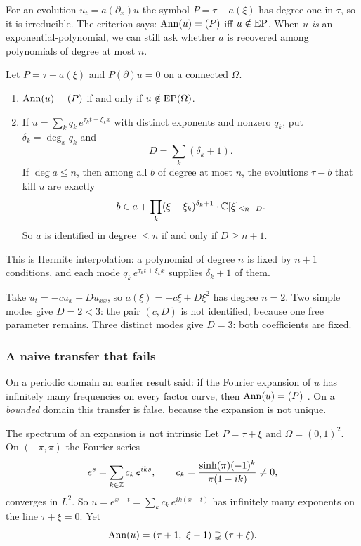 For an evolution $u_t=a(\partial_x)u$ the symbol $P=\tau-a(\xi)$ has degree one in $\tau$, so it is irreducible. The criterion says: $\operatorname{Ann}(u)=(P)$ iff $u\notin\mathrm{EP}$. When $u$ \emph{is} an exponential-polynomial, we can still ask whether $a$ is recovered among polynomials of degree at most $n$.

\begin{theorem}\label{thm:evol}
Let $P=\tau-a(\xi)$ and $P(\partial)u=0$ on a connected $\Omega$.
\begin{enumerate}[label=(\alph*)]
\item $\operatorname{Ann}(u)=(P)$ if and only if $u\notin\mathrm{EP}(\Omega)$.
\item If $u=\sum_kq_k\,e^{\tau_kt+\xi_kx}$ with distinct exponents and nonzero $q_k$, put $\delta_k=\deg_xq_k$ and
\[
D=\sum_k(\delta_k+1).
\]
If $\deg a\le n$, then among all $b$ of degree at most $n$, the evolutions $\tau-b$ that kill $u$ are exactly
\[
b\in a+\prod_k(\xi-\xi_k)^{\delta_k+1}\cdot\mathbb{C}[\xi]_{\le n-D}.
\]
So $a$ is identified in degree $\le n$ if and only if $D\ge n+1$.
\end{enumerate}
\end{theorem}

This is Hermite interpolation: a polynomial of degree $n$ is fixed by $n+1$ conditions, and each mode $q_k\,e^{\tau_kt+\xi_kx}$ supplies $\delta_k+1$ of them.

\begin{example}
Take $u_t=-cu_x+Du_{xx}$, so $a(\xi)=-c\xi+D\xi^2$ has degree $n=2$. Two simple modes give $D=2<3$: the pair $(c,D)$ is not identified, because one free parameter remains. Three distinct modes give $D=3$: both coefficients are fixed.
\end{example}

\subsubsection{A naive transfer that fails}

On a periodic domain an earlier result said: if the Fourier expansion of $u$ has infinitely many frequencies on every factor curve, then $\operatorname{Ann}(u)=(P)$ . On a \emph{bounded} domain this transfer is false, because the expansion is not unique.

\begin{falsebox}{The spectrum of an expansion is not intrinsic  \falsest}\label{cex:C3C1}
Let $P=\tau+\xi$ and $\Omega=(0,1)^2$. On $(-\pi,\pi)$ the Fourier series
\[
e^{s}=\sum_{k\in\mathbb{Z}}c_k\,e^{iks},\qquad c_k=\frac{\sinh(\pi)(-1)^k}{\pi(1-ik)}\neq0,
\]
converges in $L^2$. So $u=e^{x-t}=\sum_kc_k\,e^{ik(x-t)}$ has infinitely many exponents on the line $\tau+\xi=0$. Yet
\[
\Ann(u)=(\tau+1,\ \xi-1)\supsetneq(\tau+\xi).
\]
\end{falsebox}


